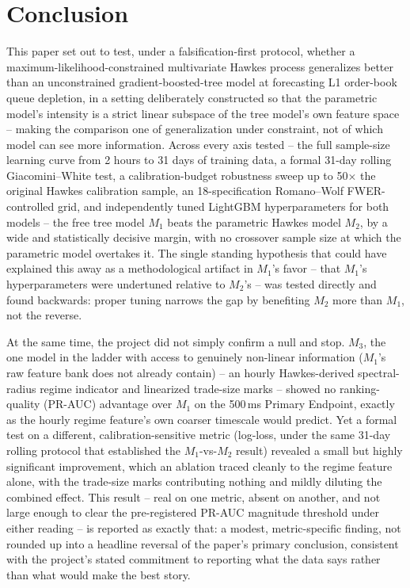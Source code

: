 \section{Conclusion}
\label{sec:conclusion}

This paper set out to test, under a falsification-first protocol, whether
a maximum-likelihood-constrained multivariate Hawkes process generalizes
better than an unconstrained gradient-boosted-tree model at forecasting
L1 order-book queue depletion, in a setting deliberately constructed so
that the parametric model's intensity is a strict linear subspace of the
tree model's own feature space -- making the comparison one of
generalization under constraint, not of which model can see more
information. Across every axis tested -- the full sample-size learning
curve from 2 hours to 31 days of training data, a formal 31-day rolling
Giacomini--White test, a calibration-budget robustness sweep up to
50$\times$ the original Hawkes calibration sample, an 18-specification
Romano--Wolf FWER-controlled grid, and independently tuned LightGBM
hyperparameters for both models -- the free tree model $M_1$ beats the
parametric Hawkes model $M_2$, by a wide and statistically decisive
margin, with no crossover sample size at which the parametric model
overtakes it. The single standing hypothesis that could have explained
this away as a methodological artifact in $M_1$'s favor -- that $M_1$'s
hyperparameters were undertuned relative to $M_2$'s -- was tested
directly and found backwards: proper tuning narrows the gap by
benefiting $M_2$ more than $M_1$, not the reverse.

At the same time, the project did not simply confirm a null and stop.
$M_3$, the one model in the ladder with access to genuinely non-linear
information ($M_1$'s raw feature bank does not already contain) -- an
hourly Hawkes-derived spectral-radius regime indicator and linearized
trade-size marks -- showed no ranking-quality (PR-AUC) advantage over
$M_1$ on the 500\,ms Primary Endpoint, exactly as the hourly regime
feature's own coarser timescale would predict. Yet a formal test on a
different, calibration-sensitive metric (log-loss, under the same
31-day rolling protocol that established the $M_1$-vs-$M_2$ result)
revealed a small but highly significant improvement, which an ablation
traced cleanly to the regime feature alone, with the trade-size marks
contributing nothing and mildly diluting the combined effect. This
result -- real on one metric, absent on another, and not large enough to
clear the pre-registered PR-AUC magnitude threshold under either reading
-- is reported as exactly that: a modest, metric-specific finding, not
rounded up into a headline reversal of the paper's primary conclusion,
consistent with the project's stated commitment to reporting what the
data says rather than what would make the best story.

